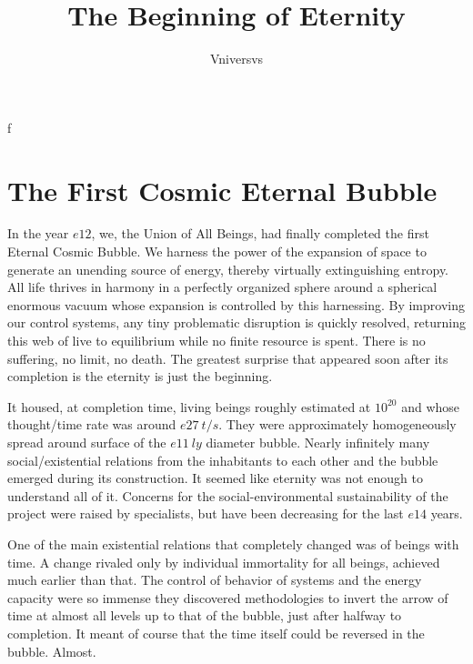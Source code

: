 \documentclass[]{article}
\title{The Beginning of Eternity}
\author{Vniversvs}
\begin{document}
f
	
	\maketitle
	
	\begin{abstract}
		
	\end{abstract}
	
	\section{The First Cosmic Eternal Bubble}
	
	In the year $e12$, we, the Union of All Beings, had finally completed the first Eternal Cosmic Bubble. We harness the power of the expansion of space to generate an unending source of energy, thereby virtually extinguishing entropy. All life thrives in harmony in a perfectly organized sphere around a spherical enormous vacuum whose expansion is controlled by this harnessing. By improving our control systems, any tiny problematic disruption is quickly resolved, returning this web of live to equilibrium while no finite resource is spent. There is no suffering, no limit, no death. The greatest surprise that appeared soon after its completion is the eternity is just the beginning.
	
	It housed, at completion time, living beings roughly estimated at $10^{20}$ and whose thought/time rate was around $e27 \ t/s$. They were approximately homogeneously spread around surface of the $e11 \ ly$ diameter bubble. Nearly infinitely many social/existential relations from the inhabitants to each other and the bubble emerged during its construction. It seemed like eternity was not enough to understand all of it. Concerns for the social-environmental sustainability of the project were raised by specialists, but have been decreasing for the last $e14$ years. 
	
	
	
	One of the main existential relations that completely changed was of beings with time. A change rivaled only by individual immortality for all beings, achieved much earlier than that. The control of behavior of systems and the energy capacity were so immense they discovered methodologies to invert the arrow of time at almost all levels up to that of the bubble, just after halfway to completion. It meant of course that the time itself could be reversed in the bubble. Almost.
	
\end{document}
